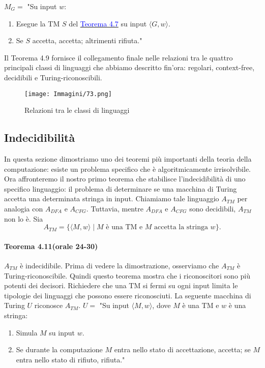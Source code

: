 \documentclass{article}
\begin{document}
$M_G = $ "Su input $w$:
\begin{enumerate}
    \item Esegue la TM $S$ del \hyperref[teorema-4.7]{\textcolor{blue}{Teorema 4.7}} su input $\langle G,w \rangle$.
    \item Se $S$ accetta, accetta; altrimenti rifiuta."
\end{enumerate}
\vspace{1em}
\text{}
\newline
Il Teorema 4.9 fornisce il collegamento finale nelle relazioni tra le quattro principali classi di linguaggi che abbiamo descritto fin'ora: regolari, context-free, decidibili e Turing-riconoscibili.
\begin{figure}[H]
    \centering
    \texttt{[image: Immagini/73.png]}
    \caption{Relazioni tra le classi di linguaggi}
    \label{figura-4.10}
\end{figure}

\subsection{Indecidibilità}
In questa sezione dimostriamo uno dei teoremi più importanti della teoria della computazione:
esiste un problema specifico che è algoritmicamente irrisolvibile.
\vspace{1em}
\text{}
\newline
Ora affronteremo il nostro primo teorema che stabilisce l'indecidibilità di uno specifico linguaggio:
il problema di determinare se una macchina di Turing accetta una determinata stringa in input.
Chiamiamo tale linguaggio $A_{TM}$ per analogia con $A_{DFA}$ e $A_{CFG}$.
Tuttavia, mentre $A_{DFA}$ e $A_{CFG}$ sono decidibili, $A_{TM}$ non lo è. Sia
$$
A_{TM} = \{\langle M,w \rangle \mid M \text{ è una TM e } M \text{ accetta la stringa } w \}.
$$

\paragraph{Teorema 4.11(orale 24-30)}
\label{teorema-4.11}
\text{}
\newline
$A_{TM}$ è indecidibile.
\vspace{1em}
\text{}
\newline
Prima di vedere la dimostrazione, osserviamo che $A_{TM}$ è Turing-riconoscibile.
Quindi questo teorema mostra che i riconoscitori sono più potenti dei decisori.
Richiedere che una TM si fermi su ogni input limita le tipologie dei linguaggi che possono essere riconosciuti.
La seguente macchina di Turing $U$ riconosce $A_{TM}$.
\vspace{1em}
\text{}
\newline
$U = $ "Su input $\langle M,w \rangle$, dove $M$ è una TM e $w$ è una stringa:
\begin{enumerate}
    \item Simula $M$ su input $w$.
    \item Se durante la computazione $M$ entra nello stato di accettazione, accetta; se $M$ entra nello stato di rifiuto, rifiuta."
\end{enumerate}
\end{document}
